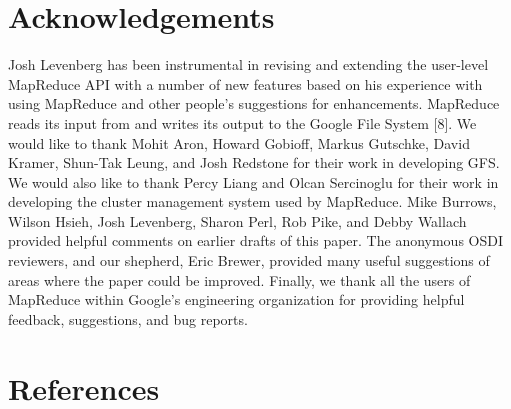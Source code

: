 \documentclass[
]{article}
\begin{document}
\section{Acknowledgements}\label{acknowledgements}

Josh Levenberg has been instrumental in revising and extending the
user-level MapReduce API with a number of new features based on his
experience with using MapReduce and other people's suggestions for
enhancements. MapReduce reads its input from and writes its output to
the Google File System {[}8{]}. We would like to thank Mohit Aron,
Howard Gobioff, Markus Gutschke, David Kramer, Shun-Tak Leung, and Josh
Redstone for their work in developing GFS. We would also like to thank
Percy Liang and Olcan Sercinoglu for their work in developing the
cluster management system used by MapReduce. Mike Burrows, Wilson Hsieh,
Josh Levenberg, Sharon Perl, Rob Pike, and Debby Wallach provided
helpful comments on earlier drafts of this paper. The anonymous OSDI
reviewers, and our shepherd, Eric Brewer, provided many useful
suggestions of areas where the paper could be improved. Finally, we
thank all the users of MapReduce within Google's engineering
organization for providing helpful feedback, suggestions, and bug
reports.

\section{References}\label{references}
\end{document}
